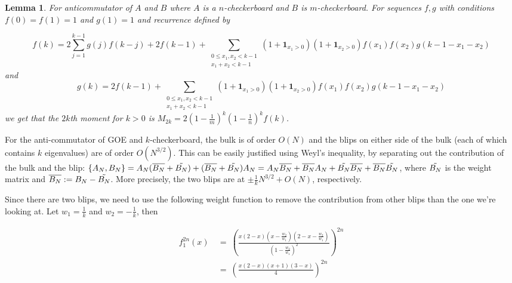 \documentclass[12pt,reqno]{amsart}
\theoremstyle{plain} %
\newtheorem{lemma}[theorem]{Lemma}
\theoremstyle{remark}
\theoremstyle{definition}
\begin{document}
\begin{lemma} For anticommutator of $A$ and $B$ where $A$ is a $n$-checkerboard and $B$ is $m$-checkerboard. For sequences $f,g$ with conditions $f(0)=f(1)=1$ and $g(1)=1$ and recurrence defined by

\[
f(k)=2\sum_{j=1}^{k-1}g(j)f(k-j) + 2f(k-1) + \sum_{\substack{0\leq x_1,x_2<k-1\\ x_1+x_2<k-1}}(1+\mathbf{1}_{x_1>0})(1+\mathbf{1}_{x_2>0})f(x_1)f(x_2)g(k-1-x_1-x_2)
\]
and 
\[
g(k)=2f(k-1) + \sum_{\substack{0\leq x_1,x_2<k-1\\ x_1+x_2<k-1}}(1+\mathbf{1}_{x_1>0})(1+\mathbf{1}_{x_2>0})f(x_1)f(x_2)g(k-1-x_1-x_2)
\]
we get that the $2k$th moment for $k>0$ is $M_{2k}=2(1-\frac{1}{m})^{k}(1-\frac{1}{n})^{k}f(k)$.
\end{lemma}

For the anti-commutator of GOE and $k$-checkerboard, the bulk is of order $O(N)$ and the blips on either side of the bulk (each of which contains $k$ eigenvalues) are of order $O(N^{3/2})$. This can be easily justified using Weyl's inequality, by separating out the contribution of the bulk and the blip: $\{A_N,B_N\}=A_N(\overline{B_N}+\Tilde{B_N})+(\overline{B_N}+\Tilde{B_N})A_N=A_N\overline{B_N}+\overline{B_N}A_N+\Tilde{B_N}\overline{B_N}+\overline{B_N}\Tilde{B_N}$, where $\Tilde{B_N}$ is the weight matrix and $\overline{B_N}:=B_N-\Tilde{B_N}$. More precisely, the two blips are at $\pm\frac{1}{k}N^{3/2}+O(N)$, respectively.

Since there are two blips, we need to use the following weight function to remove the contribution from other blips than the one we're looking at. Let $w_1=\frac{1}{k}$ and $w_2=-\frac{1}{k}$, then

\begin{align*}
f_1^{2n}(x) &\ = \ \left(\frac{x(2-x)(x-\frac{w_2}{w_1})(2-x-\frac{w_2}{w_1})}{(1-\frac{w_2}{w_1})^2}\right)^{2n} \\
&\ = \ \left(\frac{x(2-x)(x+1)(3-x)}{4}\right)^{2n}\end{align*}
\end{document}
